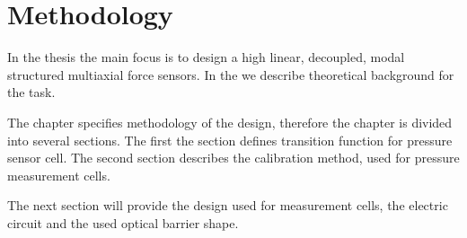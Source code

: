 \chapter{Methodology}
\label{chapter:methodology}
In the thesis the main focus is to design a high linear, decoupled, modal structured multiaxial force sensors.
In the  we describe theoretical background for the
task. 

The chapter specifies methodology of the design, therefore the chapter is divided into several sections. The first the  section 
defines transition function for pressure sensor cell. The second section  describes the calibration method, used for pressure measurement cells.

The next  section will provide the design used for measurement cells, the electric circuit and the used optical barrier shape.




